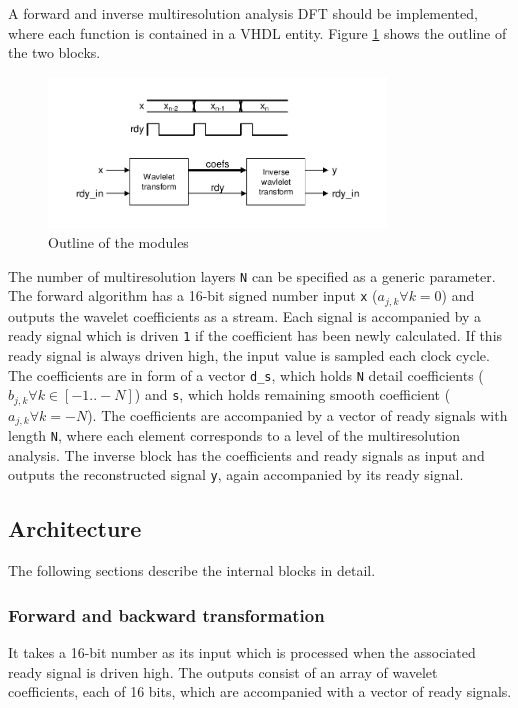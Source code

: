 \begin{refsection}
A forward and inverse multiresolution analysis DFT should be implemented, where each function is contained in a VHDL entity.
Figure \ref{fpga:fig:idea} shows the outline of the two blocks.
\begin{figure}
	\centering
	\includegraphics[width=0.8\textwidth]{papers/fpga/images/idea.pdf}
	\caption{Outline of the modules \label{fpga:fig:idea}}
\end{figure}
The number of multiresolution layers \texttt{N} can be specified as a generic parameter.
The forward algorithm has a 16-bit signed number input \texttt{x} ($a_{j,k} \forall k=0$) and outputs the wavelet coefficients as a stream.
Each signal is accompanied by a ready signal which is driven \texttt{1} if the coefficient has been newly calculated.
If this ready signal is always driven high, the input value is sampled each clock cycle.
The coefficients are in form of a vector \texttt{d\_s}, which holds \texttt{N} detail coefficients ($b_{j,k} \forall k \in [-1 .. -N]$) and \texttt{s}, which holds remaining smooth coefficient ($a_{j,k} \forall k=-N$).
The coefficients are accompanied by a vector of ready signals with length \texttt{N}, where each element corresponds to a level of the multiresolution analysis.
The inverse block has the coefficients and ready signals as input and outputs the reconstructed signal \texttt{y}, again accompanied by its ready signal.

\subsection{Architecture}
The following sections describe the internal blocks in detail.





\subsubsection{Forward and backward transformation}


It takes a 16-bit number as its input which is processed when the associated ready signal is driven high.
The outputs consist of an array of wavelet coefficients, each of 16 bits, which are accompanied with a vector of ready signals. 


\end{refsection}
